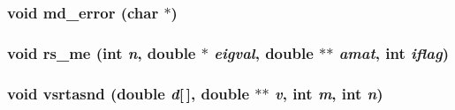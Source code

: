 \subsubsection{\setlength{\rightskip}{0pt plus 5cm}void md\_\-error (char $\ast$)}\label{ceigsys_8c_8976c9bff4b0598995fa8cc61584d873}


\subsubsection{\setlength{\rightskip}{0pt plus 5cm}void rs\_\-me (int {\em n}, double $\ast$ {\em eigval}, double $\ast$$\ast$ {\em amat}, int {\em iflag})}\label{ceigsys_8c_5f48c8b1d76b20ca6dbd16301e93b1e4}


\subsubsection{\setlength{\rightskip}{0pt plus 5cm}void vsrtasnd (double {\em d}[$\,$], double $\ast$$\ast$ {\em v}, int {\em m}, int {\em n})}\label{ceigsys_8c_3228238f335dfbac503d709bd2a224e1}


